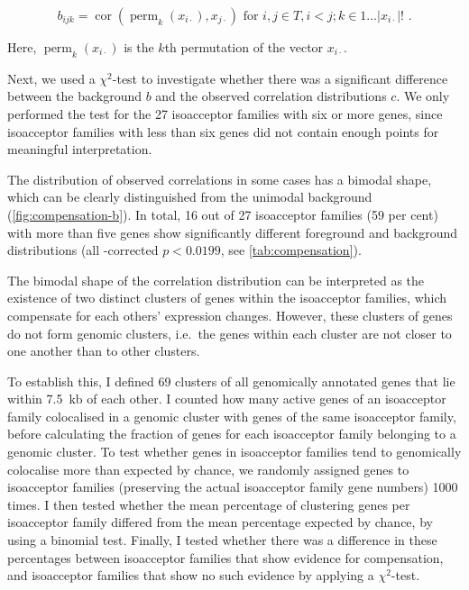 \begin{equation}
    b_{ijk} = \operatorname{cor}(\operatorname{perm}_k(x_{i\cdot}), x_{j\cdot})
        \text{\ for \(i, j \in T, i < j; k \in 1\dots\lvert x_{i\cdot}\rvert!\)\ .}
\end{equation}

Here, \(\operatorname{perm}_k(x_{i\cdot})\) is the \(k\)th permutation of the
vector \(x_{i\cdot}\).

Next, we used a \(\chi^2\)-test to investigate whether there was a significant
difference between the background \(b\) and the observed correlation
distributions \(c\). We only performed the test for the \num{27} isoacceptor
families with six or more genes, since isoacceptor families with less than six
genes did not contain enough points for meaningful interpretation.

The distribution of observed correlations in some cases has a bimodal shape,
which can be clearly distinguished from the unimodal background
(\cref{fig:compensation-b}). In total, \num{16} out of \num{27} isoacceptor
families (\num{59} per cent) with more than five genes show significantly
different foreground and background distributions (all \fdr-corrected \(p <
0.0199\), see \cref{tab:compensation}).

The bimodal shape of the correlation distribution can be interpreted as the
existence of two distinct clusters of \trna genes within the isoacceptor
families, which compensate for each others’ expression changes. However, these
clusters of genes do not form genomic clusters, i.e.\ the \trna genes within
each cluster are not closer to one another than to other clusters.

To establish this, I defined \num{69} clusters of all genomically annotated
\trna genes that lie within \SI{7.5}{kb} of each other. I counted how many
active \trna genes of an isoacceptor family colocalised in a genomic cluster
with \trna genes of the same isoacceptor family, before calculating the fraction
of \trna genes for each isoacceptor family belonging to a genomic cluster. To
test whether genes in isoacceptor families tend to genomically colocalise more
than expected by chance, we randomly assigned \trna genes to isoacceptor
families (preserving the actual isoacceptor family gene numbers) \num{1000}
times. I then tested whether the mean percentage of clustering \trna genes per
isoacceptor family differed from the mean percentage expected by chance, by
using a binomial test. Finally, I tested whether there was a difference in these
percentages between isoacceptor families that show evidence for compensation,
and isoacceptor families that show no such evidence by applying a
\(\chi^2\)-test.

